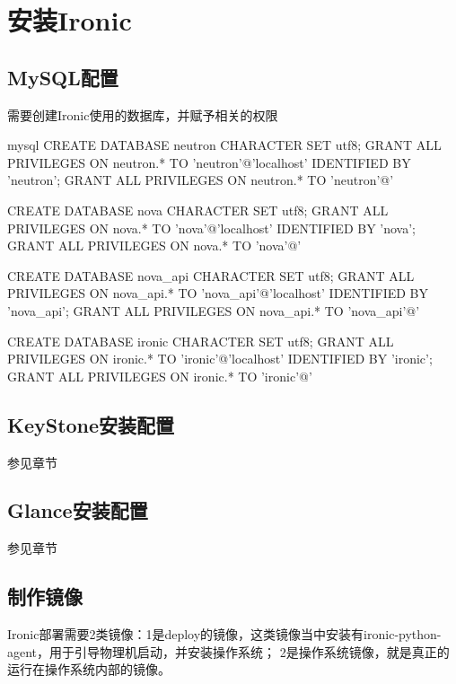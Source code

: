 \chapter{安装Ironic}

\section{MySQL配置}

需要创建Ironic使用的数据库，并赋予相关的权限
\begin{code-block}{mysql}
CREATE DATABASE neutron CHARACTER SET utf8;
GRANT ALL PRIVILEGES ON neutron.* TO 'neutron'@'localhost' IDENTIFIED BY 'neutron';
GRANT ALL PRIVILEGES ON neutron.* TO 'neutron'@'%

CREATE DATABASE nova CHARACTER SET utf8;
GRANT ALL PRIVILEGES ON nova.* TO 'nova'@'localhost' IDENTIFIED BY 'nova';
GRANT ALL PRIVILEGES ON nova.* TO 'nova'@'%

CREATE DATABASE nova_api CHARACTER SET utf8;
GRANT ALL PRIVILEGES ON nova_api.* TO 'nova_api'@'localhost' IDENTIFIED BY 'nova_api';
GRANT ALL PRIVILEGES ON nova_api.* TO 'nova_api'@'%

CREATE DATABASE ironic CHARACTER SET utf8;
GRANT ALL PRIVILEGES ON ironic.* TO 'ironic'@'localhost' IDENTIFIED BY 'ironic';
GRANT ALL PRIVILEGES ON ironic.* TO 'ironic'@'%
\end{code-block}

\section{KeyStone安装配置}
参见章节

\section{Glance安装配置}
参见章节

\section{制作镜像}
Ironic部署需要2类镜像：1是deploy的镜像，这类镜像当中安装有ironic-python-agent，用于引导物理机启动，并安装操作系统；
2是操作系统镜像，就是真正的运行在操作系统内部的镜像。

